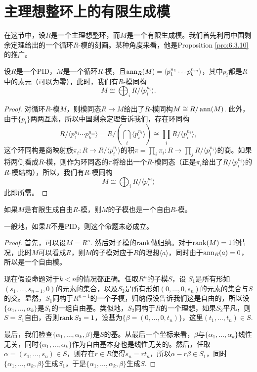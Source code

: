 \section{主理想整环上的有限生成模}

在这节中，设$R$是一个主理想整环，而$M$是一个有限生成模。我们首先利用中国剩余定理给出的一个循环$R$-模的刻画。某种角度来看，他是Proposition \ref{pro:6.3.10} 的推广。

\begin{pro}
    设$R$是一个PID，$M$是一个循环$R$-模，且$\operatorname{ann}_R(M)=\langle p_1^{n_1}\cdots p_k^{n_m}\rangle$，其中$p_i$都是$R$中的素元（可以为零），此时，我们有$R$-模同构
    \[
        M\cong \bigoplus_i R/\langle p_i^{n_i}\rangle.
    \]
\end{pro}

\begin{proof}
    对循环$R$-模$M$，则模同态$R\to M$给出了$R$-模同构$M\cong R/\operatorname{ann}(M)$. 此外，由于$\{p_i\}$两两互素，所以中国剩余定理告诉我们，存在环同构
    \[
        R/\langle p_1^{n_1}\cdots p_k^{n_m}\rangle = R/\left(\bigcap_i \langle p_i^{n_i}\rangle\right)\cong \prod_i R/\langle p_i^{n_i}\rangle,
    \]
    这个环同构是商映射族$\pi_i:R\to R/\langle p_i^{n_i}\rangle$的积$\pi=\prod_i \pi_i:R\to \prod_j R/\langle p_i^{n_i}\rangle$的商。如果将两侧看成$R$-模，则作为环同态的$\pi$将给出一个$R$-模同态（正是$\pi_i$给出了$R/\langle p_i^{n_i}\rangle$的$R$-模结构），所以，我们有$R$-模同构
    \[
        M\cong \bigoplus_i R/\langle p_i^{n_i}\rangle
    \]
    此即所需。
\end{proof}

\begin{pro}
	如果$M$是有限生成自由$R$-模，则$M$的子模也是一个自由$R$-模。
\end{pro}

一般地，如果$R$不是PID，则这个命题未必成立。

\begin{proof}
	首先，可以设$M=R^n$. 然后对子模的$\operatorname{rank}$做归纳。对于$\operatorname{rank}(M)=1$的情况，此时$M$可以看成$R$，则$M$的子模对应于$R$的理想$\langle a\rangle$，同时由于$\operatorname{ann}_R (a)=0$，所以是一个自由模。

	现在假设命题对于$k<n$的情况都正确。任取$R^n$的子模$S$，设 $S_1$是所有形如$(s_1,\dots,s_{n-1},0)$的元素的集合，以及$S_2$是所有形如$(0,\dots,0,s_n)$的元素的集合与$S$的交。显然，$S_1$同构于$R^{n-1}$的一个子模，归纳假设告诉我们这是自由的，所以设$\{\alpha_1,\dots,\alpha_k\}$是$S_1$的一组自由基。类似地，$S_2$同构于$R$的一个理想，如果$S_2$平凡，则$S=S_1$自由，否则$\operatorname{rank} S_2=1$，设基为$\{\beta=(0,\dots,0,t_n)\}$，这里$(t_1,\dots,t_n)\in S$. 

	最后，我们检查$\{\alpha_1,\dots,\alpha_k,\beta\}$是$S$的基。从最后一个坐标来看，$\beta$与$\{\alpha_1,\dots,\alpha_k\}$线性无关，同时$\{\alpha_1,\dots,\alpha_k\}$作为自由基本身也是线性无关的。然后，任取$\alpha=(s_1,\dots,s_n)\in S$，则存在$r\in R$使得$s_n=rt_n$，所以$\alpha-r\beta\in S_1$，同时$\{\alpha_1,\dots,\alpha_k,\beta\}$生成$S_1$，于是$\{\alpha_1,\dots,\alpha_k,\beta\}$生成$S$.
\end{proof}

